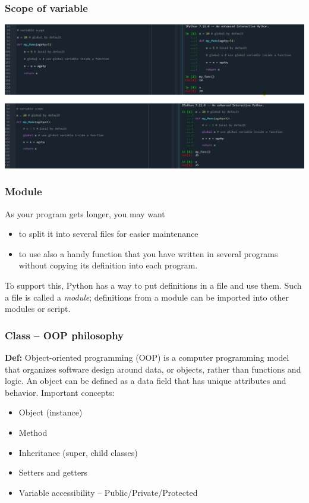 \documentclass{beamer}
\begin{document}
    
    \begin{frame}
    \frametitle{Scope of variable}
        \centering
        \includegraphics[scale=0.5]{figures/variable_scope.jpg}
    \end{frame}
    
    \begin{frame}
    \frametitle{Module}
    
    As your program gets longer, you may want
    \begin{itemize}
        \item to split it into several files 
        for easier maintenance
        \item to use also a handy function that
        you have written in several programs without copying its definition into each 
        program.
    \end{itemize}
    
    \vskip 2mm 
    
    To support this, Python has a way to put definitions in a file
    and use them. Such a file is called a \textit{module}; definitions from 
    a module can be imported into other modules or script. 
    
    \end{frame}
    
    
    \begin{frame}
    \frametitle{Class – OOP philosophy}
    
    \textbf{Def:} Object-oriented programming (OOP) is a computer programming 
    model that organizes software design around data, or objects, 
    rather than functions and logic. An object can be defined as a 
    data field that has unique attributes and behavior.
    \vskip 2mm 
    Important concepts:
        \begin{itemize}
            \item Object (instance)
            \item Method
            \item Inheritance (super, child classes)
            \item Setters and getters
            \item Variable accessibility – Public/Private/Protected
        \end{itemize}
    \end{frame}
\end{document}
